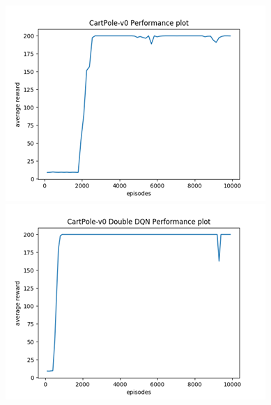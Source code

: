 \documentclass[12pt]{article}
\begin{document}
\begin{solution}
\includegraphics[scale=0.8]{Completed_Graphs/Cartpole_Single_Q.png}\\
\includegraphics[scale=0.8]{Completed_Graphs/Cartpole_Double_Q.png}


\end{solution}
\end{document}
